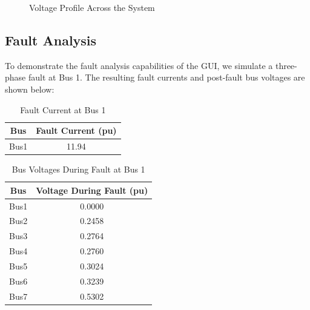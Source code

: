 \documentclass{article}
\begin{document}
	\begin{figure}[H]
		\centering
		\caption{Voltage Profile Across the System}
		\label{fig:voltage_profile}
	\end{figure}
	
	\subsection{Fault Analysis}
	
	To demonstrate the fault analysis capabilities of the GUI, we simulate a three-phase fault at Bus 1. The resulting fault currents and post-fault bus voltages are shown below:
	
	\begin{table}[H]
		\centering
		\begin{tabular}{cc}
			\hline
			\textbf{Bus} & \textbf{Fault Current (pu)} \\
			\hline
			Bus1 & 11.94 \\
			\hline
		\end{tabular}
		\caption{Fault Current at Bus 1}
		\label{tab:fault_current}
	\end{table}
	
	\begin{table}[H]
		\centering
		\begin{tabular}{cc}
			\hline
			\textbf{Bus} & \textbf{Voltage During Fault (pu)} \\
			\hline
			Bus1 & 0.0000 \\
			Bus2 & 0.2458 \\
			Bus3 & 0.2764 \\
			Bus4 & 0.2760 \\
			Bus5 & 0.3024 \\
			Bus6 & 0.3239 \\
			Bus7 & 0.5302 \\
			\hline
		\end{tabular}
		\caption{Bus Voltages During Fault at Bus 1}
		\label{tab:fault_voltages}
	\end{table}
	
\end{document}
